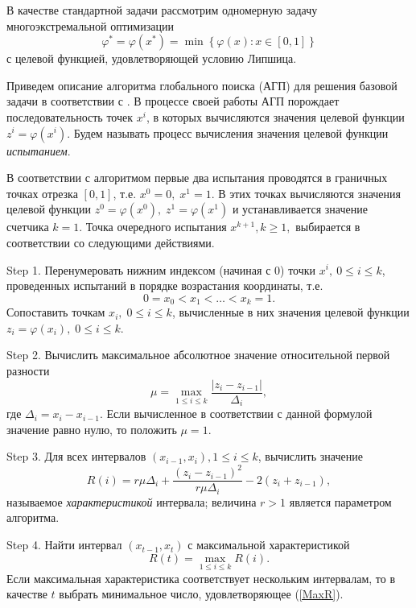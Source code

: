 \documentclass[entropy,article,submit,moreauthors,pdftex]{Definitions/mdpi}
\begin{document}
В качестве стандартной задачи рассмотрим одномерную задачу многоэкстремальной оптимизации 
\begin{equation}\label{uni_problem}
\varphi^\ast = \varphi(x^\ast)=\min{\left\{\varphi(x):x\in \left[0,1\right] 
\right\}}
\end{equation}
с целевой функцией, удовлетворяющей условию Липшица.

Приведем описание алгоритма глобального поиска (АГП) для решения базовой задачи в соответствии с \cite{Strongin2000}.
В процессе своей работы АГП порождает последовательность точек $x^i$, в которых вычисляются значения целевой функции $z^i=\varphi(x^i)$. 
Будем называть процесс вычисления значения целевой функции \textit{испытанием}.

В соответствии с алгоритмом первые два испытания проводятся в граничных точках отрезка $[0,1]$, т.е. $x^0=0,\;x^1=1$. 
В этих точках вычисляются значения целевой функции $z^0=\varphi(x^0),\;z^1=\varphi(x^1)$ и устанавливается значение счетчика $k=1$. 
Точка очередного испытания $x^{k+1}, k\geq 1,$ выбирается в соответствии со следующими действиями.

 Step 1. Перенумеровать нижним индексом (начиная с 0) точки $x^i,\:0\leq i\leq k$, проведенных испытаний в порядке возрастания координаты, т.е.
\[
0=x_0<x_1<\ldots <x_{k}=1.
\] 
Сопоставить точкам $x_i, \; 0\leq i\leq k$, вычисленные в них значения целевой функции $z_i=\varphi(x_i), \; 0\leq i\leq k$.

Step 2. Вычислить максимальное абсолютное значение относительной первой разности
\begin{equation}\label{mu}
\mu=\max_{1\leq i\leq k}\frac{\left|z_i-z_{i-1}\right|}{\Delta_i},
\end{equation}
где $\Delta_i = x_i-x_{i-1}$. Если вычисленное в соответствии с данной формулой значение равно нулю, то положить $\mu = 1$.

Step 3. Для всех интервалов $(x_{i-1},x_i),1\leq i\leq k$,  вычислить значение
\begin{equation}\label{R}
R(i)=r\mu\Delta_i+\frac{(z_i-z_{i-1})^2}{r\mu\Delta_i}-2(z_i+z_{i-1}),
\end{equation} 
называемое \textit{характеристикой} интервала; величина $r>1$ является параметром алгоритма. 

Step 4. Найти интервал $(x_{t-1},x_t)$ с максимальной характеристикой
\begin{equation}\label{MaxR}
R(t)=\max_{1\leq i\leq {k}}R(i).
\end{equation}
Если максимальная характеристика соответствует нескольким интервалам, то в качестве $t$ выбрать минимальное число, удовлетворяющее (\ref{MaxR}).
\end{document}

